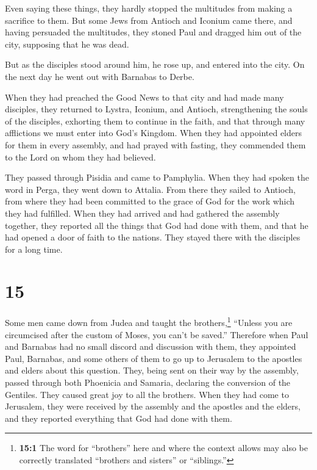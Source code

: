  Even saying these things, they hardly stopped the
multitudes from making a sacrifice to them.  But some
Jews from Antioch and Iconium came there, and having persuaded the
multitudes, they stoned Paul and dragged him out of the city, supposing
that he was dead.

 But as the disciples stood around him, he rose up, and
entered into the city. On the next day he went out with Barnabas to
Derbe.

 When they had preached the Good News to that city and
had made many disciples, they returned to Lystra, Iconium, and Antioch,
 strengthening the souls of the disciples, exhorting them
to continue in the faith, and that through many afflictions we must
enter into God's Kingdom.  When they had appointed elders
for them in every assembly, and had prayed with fasting, they commended
them to the Lord on whom they had believed.

 They passed through Pisidia and came to Pamphylia.
 When they had spoken the word in Perga, they went down
to Attalia.  From there they sailed to Antioch, from
where they had been committed to the grace of God for the work which
they had fulfilled.  When they had arrived and had
gathered the assembly together, they reported all the things that God
had done with them, and that he had opened a door of faith to the
nations.  They stayed there with the disciples for a long
time.

\hypertarget{section-14}{%
\section{15}\label{section-14}}

 Some men came down from Judea and taught the
brothers,\footnote{\textbf{15:1} The word for ``brothers'' here and
  where the context allows may also be correctly translated ``brothers
  and sisters'' or ``siblings.''} ``Unless you are circumcised after the
custom of Moses, you can't be saved.''  Therefore when
Paul and Barnabas had no small discord and discussion with them, they
appointed Paul, Barnabas, and some others of them to go up to Jerusalem
to the apostles and elders about this question.  They,
being sent on their way by the assembly, passed through both Phoenicia
and Samaria, declaring the conversion of the Gentiles. They caused great
joy to all the brothers.  When they had come to Jerusalem,
they were received by the assembly and the apostles and the elders, and
they reported everything that God had done with them.


